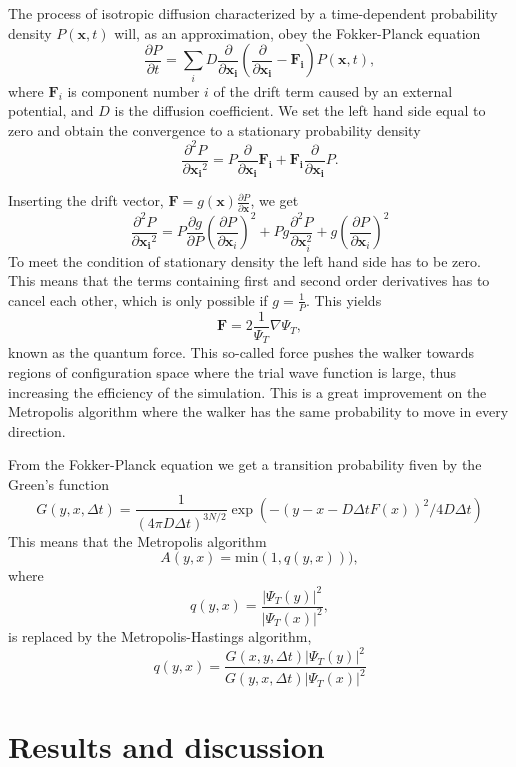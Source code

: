 \documentclass[11pt]{article}
\begin{document}
The process of isotropic diffusion characterized by a time-dependent
probability density $P\left(\mathbf{x},t\right)$ will, as an approximation,
obey the Fokker-Planck equation 
\[
\frac{\partial P}{\partial t}=\sum_{i}D\frac{\partial}{\partial\mathbf{x_{i}}}\left(\frac{\partial}{\partial\mathbf{x_{i}}}-\mathbf{F_{i}}\right)P(\mathbf{x},t),
\]
where $\mathbf{F}_{i}$ is component number $i$ of the drift term
caused by an external potential, and $D$ is the diffusion coefficient.
We set the left hand side equal to zero and obtain the convergence
to a stationary probability density
\[
\frac{\partial^{2}P}{\partial{\mathbf{x_{i}}^{2}}}=P\frac{\partial}{\partial{\mathbf{x_{i}}}}\mathbf{F_{i}}+\mathbf{F_{i}}\frac{\partial}{\partial{\mathbf{x_{i}}}}P.
\]


Inserting the drift vector, $\mathbf{F}=g(\mathbf{x})\frac{\partial P}{\partial\mathbf{x}}$,
we get
\[
\frac{\partial^{2}P}{\partial{\mathbf{x_{i}}^{2}}}=P\frac{\partial g}{\partial P}\left(\frac{\partial P}{\partial{\mathbf{x}_{i}}}\right)^{2}+Pg\frac{\partial^{2}P}{\partial{\mathbf{x}_{i}^{2}}}+g\left(\frac{\partial P}{\partial{\mathbf{x}_{i}}}\right)^{2}
\]
To meet the condition of stationary density the left hand side has
to be zero. This means that the terms containing first and second
order derivatives has to cancel each other, which is only possible
if $g=\frac{1}{P}$. This yields
\[
\mathbf{F}=2\frac{1}{\Psi_{T}}\nabla\Psi_{T},
\]
known as the quantum force. This so-called force pushes the walker
towards regions of configuration space where the trial wave function
is large, thus increasing the efficiency of the simulation. This is
a great improvement on the Metropolis algorithm where the walker has
the same probability to move in every direction.

From the Fokker-Planck equation we get a transition probability fiven
by the Green's function
\[
G(y,x,\Delta t)=\frac{1}{(4\pi D\Delta t)^{3N/2}}\exp{\left(-(y-x-D\Delta tF(x))^{2}/4D\Delta t\right)}
\]
This means that the Metropolis algorithm
\[
A(y,x)=\mathrm{min}(1,q(y,x))),
\]
where 
\[
q(y,x)=\frac{|\Psi_{T}(y)|^{2}}{|\Psi_{T}(x)|^{2}},
\]
is replaced by the Metropolis-Hastings algorithm,
\[
q(y,x)=\frac{G(x,y,\Delta t)|\Psi_{T}(y)|^{2}}{G(y,x,\Delta t)|\Psi_{T}(x)|^{2}}
\]




\section{Results and discussion}
	
\end{document}
